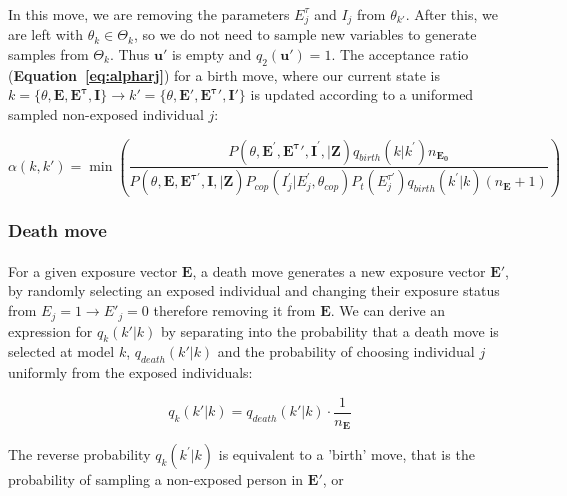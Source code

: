 \paragraph{}In this move, we are removing the parameters $E_j^\tau$ and $I_j$ from $\theta_{k'}$. After this, we are left with $\theta_k \in \Theta_k$, so we do not need to sample new variables to generate samples from $\Theta_k$. Thus $\mathbf{u}'$ is empty and  $q_2(\mathbf{u}') = 1$. The acceptance ratio (\textbf{Equation~\ref{eq:alpharj}}) for a birth move, where our current state is $k = \{\theta, \mathbf{E}, \mathbf{E^\tau}, \mathbf{I}\} \rightarrow k' = \{\theta, \mathbf{E}', \mathbf{E^\tau}', \mathbf{I}'\}$ is updated according to a uniformed sampled non-exposed individual $j$:

\begin{equation}
\label{acc:birth}
\alpha(k, k') = \min\left(\frac{P(\theta, \mathbf{E}^{\prime}, \mathbf{E^\tau \prime}, \mathbf{I}^{\prime}, | \mathbf{Z})q_{birth}(k|k^{\prime})n_{\mathbf{E_0}}}{P(\theta, \mathbf{E}, \mathbf{E^{\tau \prime}}, \mathbf{I}, | \mathbf{Z})P_{cop}(I_{j}^{\prime} | E_{j}^{\prime}, \theta_{cop})P_t(E^{\tau \prime}_j )q_{birth}(k^{\prime} |k)(n_{\mathbf{E}} + 1)} \right)
\end{equation}


\subsubsection{Death move}


\paragraph{}For a given exposure vector $\mathbf{E}$, a death move generates a new exposure vector $\mathbf{E'}$, by randomly selecting an exposed individual and changing their exposure status from $E_j = 1 \rightarrow E'_j = 0$ therefore removing it from $\mathbf{E}$. We can derive an expression for $q_k(k' | k)$ by separating into the probability that a death move is selected at model $k$, $q_{death}(k' |k)$ and the probability of choosing individual $j$ uniformly from the exposed individuals:

\begin{equation}
q_k(k' | k) = q_{death}(k' |k)\cdot \frac{1}{n_{\mathbf{E}}}
\end{equation}

The reverse probability $q_k(k^{\prime} | k)$ is equivalent to a 'birth' move, that is the probability of sampling a non-exposed person in $\mathbf{E}'$, or 

